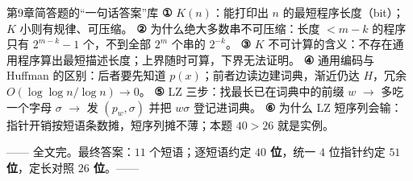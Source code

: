 \documentclass[11pt,a4paper]{ctexart}
\begin{document}
\begin{exam}{第9章简答题的“一句话答案”库}
\textbf{①} $K(n)$：能打印出 $n$ 的最短程序长度（bit）；$K$ 小则有规律、可压缩。
\textbf{②} 为什么绝大多数串不可压缩：长度 $<m-k$ 的程序只有 $2^{m-k}-1$ 个，不到全部 $2^m$ 个串的 $2^{-k}$。
\textbf{③} $K$ 不可计算的含义：不存在通用程序算出最短描述长度；上界随时可算，下界无法证明。
\textbf{④} 通用编码与 Huffman 的区别：后者要先知道 $p(x)$；前者边读边建词典，渐近仍达 $H$，冗余 $O(\log\log n/\log n)\to0$。
\textbf{⑤} LZ 三步：找最长已在词典中的前缀 $w$ $\to$ 多吃一个字母 $\sigma$ $\to$ 发 $(p_w,\sigma)$ 并把 $w\sigma$ 登记进词典。
\textbf{⑥} 为什么 LZ 短序列会输：指针开销按短语条数摊，短序列摊不薄；本题 $40>26$ 就是实例。
\end{exam}

\vspace{4pt}
\begin{center}
\small —— 全文完。最终答案：$11$ 个短语；逐短语约定 \textbf{$40$ 位}，统一 $4$ 位指针约定 \textbf{$51$ 位}，定长对照 \textbf{$26$ 位}。——
\end{center}
\end{document}
